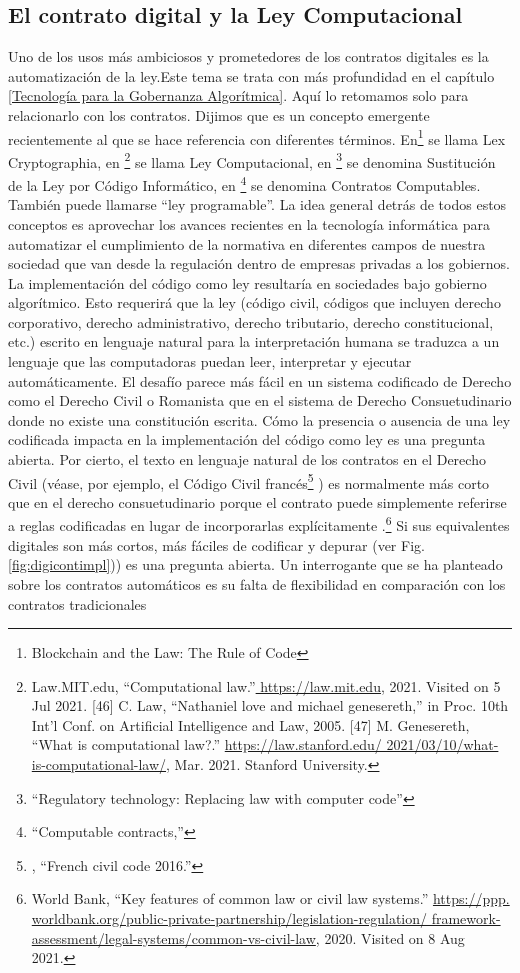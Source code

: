 \documentclass[12pt]{report} %
\begin{document}
\subsection{El contrato digital y la Ley Computacional}

Uno de los usos más ambiciosos y prometedores de los contratos digitales es   la automatización de la ley.Este tema se trata con más profundidad en el capítulo \ref{Tecnología para la Gobernanza Algorítmica}. Aquí lo retomamos solo para relacionarlo con los contratos. Dijimos que es un concepto emergente recientemente al que se hace referencia con diferentes términos. En\footnote{\cite{PrimaveraAaron2018}Blockchain and the Law: The Rule of Code}  se llama Lex Cryptographia, en \footnote{Law.MIT.edu, “Computational law.”\url{ https://law.mit.edu}, 2021. Visited on 5 Jul 2021. [46] C. Law, “Nathaniel love and michael genesereth,” in Proc. 10th Int’l Conf. on Artificial Intelligence and Law, 2005. [47] M. Genesereth, “What is computational law?.” \url{https://law.stanford.edu/ 2021/03/10/what-is-computational-law/}, Mar. 2021. Stanford University.} se llama Ley Computacional, en \footnote{\cite{Eva2020}“Regulatory technology: Replacing law with computer code” } se denomina Sustitución de la Ley por Código Informático, en \footnote{\cite{Harry2012}“Computable contracts,” } se denomina Contratos Computables. También puede llamarse “ley programable”. La idea general detrás de todos estos conceptos es aprovechar los avances recientes en la tecnología informática para automatizar el cumplimiento de la normativa en diferentes campos de nuestra sociedad que van desde la regulación dentro de empresas privadas a los gobiernos. La implementación del código como ley resultaría en sociedades bajo gobierno algorítmico. Esto requerirá que la ley (código civil, códigos que incluyen derecho corporativo, derecho administrativo, derecho tributario, derecho constitucional, etc.) escrito en lenguaje natural para la interpretación humana se traduzca a un lenguaje que las computadoras puedan leer, interpretar y ejecutar automáticamente. El desafío parece más fácil en un sistema codificado de Derecho como el Derecho Civil o Romanista que en el sistema de Derecho Consuetudinario donde no existe una constitución escrita. Cómo la presencia o ausencia de una ley codificada impacta en la implementación del código como ley es una pregunta abierta. Por cierto, el texto en lenguaje natural de los contratos en el Derecho Civil (véase, por ejemplo, el Código Civil francés\footnote{\cite{JohnCart2016}, “French civil code 2016.” } ) es normalmente más corto que en el derecho consuetudinario porque el contrato puede simplemente referirse a reglas codificadas en lugar de incorporarlas explícitamente .\footnote{World Bank, “Key features of common law or civil law systems.” \url{https://ppp. worldbank.org/public-private-partnership/legislation-regulation/ framework-assessment/legal-systems/common-vs-civil-law}, 2020. Visited on 8 Aug 2021.} Si sus equivalentes digitales son más cortos, más fáciles de codificar y depurar (ver Fig. \ref{fig:digicontimpl})) es una pregunta abierta. Un interrogante que se ha planteado sobre los contratos automáticos es su falta de flexibilidad en comparación con los contratos tradicionales 
\end{document}
